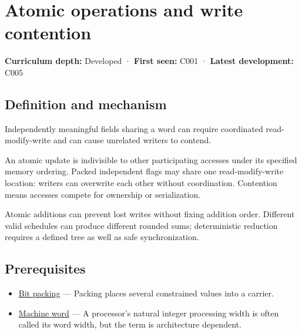 \hypertarget{appendix-e12d1b03fefb}{}\label{referencestart:appendix-e12d1b03fefb}
\section{Atomic operations and write contention}\label{appendix-e12d1b03fefb-atomic-operations-and-write-contention}

\hypertarget{appendix-e12d1b03fefb-atomic-operations-and-write-contention}{}

\textbf{Curriculum depth:} Developed · \textbf{First seen:} C001 · \textbf{Latest development:} C005

\begin{allmightroledefinition}

\subsection{Definition and mechanism}\label{appendix-e12d1b03fefb-definition-and-mechanism}

\hypertarget{appendix-e12d1b03fefb-definition-and-mechanism}{}

Independently meaningful fields sharing a word can require coordinated read-modify-write and can cause unrelated writers to contend.

\end{allmightroledefinition}

An atomic update is indivisible to other participating accesses under its specified memory ordering. Packed independent flags may share one read-modify-write location: writers can overwrite each other without coordination. Contention means accesses compete for ownership or serialization.

Atomic additions can prevent lost writes without fixing addition order. Different valid schedules can produce different rounded sums; deterministic reduction requires a defined tree as well as safe synchronization.

\subsection{Prerequisites}\label{appendix-e12d1b03fefb-prerequisites}

\hypertarget{appendix-e12d1b03fefb-prerequisites}{}

\begin{itemize}
\tightlist
\item
  \hyperref[appendix-1f9963e1a5d1]{Bit packing} --- Packing places several constrained values into a carrier.
\item
  \hyperref[appendix-d67a19507dc5]{Machine word} --- A processor's natural integer processing width is often called its word width, but the term is architecture dependent.
\end{itemize}

